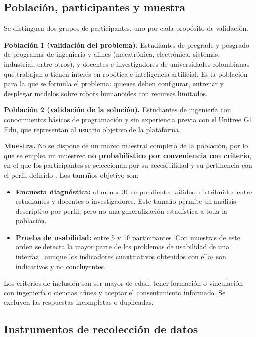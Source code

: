 \documentclass[stu,12pt,floatsintext]{apa7}
\begin{document}
\subsection{Población, participantes y muestra}

Se distinguen dos grupos de participantes, uno por cada propósito de validación.

\textbf{Población 1 (validación del problema).} Estudiantes de pregrado y posgrado de programas de ingeniería y afines (mecatrónica, electrónica, sistemas, industrial, entre otros), y docentes e investigadores de universidades colombianas que trabajan o tienen interés en robótica e inteligencia artificial. Es la población para la que se formula el problema: quienes deben configurar, entrenar y desplegar modelos sobre robots humanoides con recursos limitados.

\textbf{Población 2 (validación de la solución).} Estudiantes de ingeniería con conocimientos básicos de programación y sin experiencia previa con el Unitree G1 Edu, que representan al usuario objetivo de la plataforma.

\textbf{Muestra.} No se dispone de un marco muestral completo de la población, por lo que se emplea un muestreo \textbf{no probabilístico por conveniencia con criterio}, en el que los participantes se seleccionan por su accesibilidad y su pertinencia con el perfil definido \parencite{otzen2017muestreo}. Los tamaños objetivo son:

\begin{itemize}
    \item \textbf{Encuesta diagnóstica:} al menos 30 respondientes válidos, distribuidos entre estudiantes y docentes o investigadores. Este tamaño permite un análisis descriptivo por perfil, pero no una generalización estadística a toda la población.
    \item \textbf{Prueba de usabilidad:} entre 5 y 10 participantes. Con muestras de este orden se detecta la mayor parte de los problemas de usabilidad de una interfaz \parencite{nielsen1993mathematical}, aunque los indicadores cuantitativos obtenidos con ellas son indicativos y no concluyentes.
\end{itemize}

Los criterios de inclusión son ser mayor de edad, tener formación o vinculación con ingeniería o ciencias afines y aceptar el consentimiento informado. Se excluyen las respuestas incompletas o duplicadas.

\subsection{Instrumentos de recolección de datos}
\end{document}
